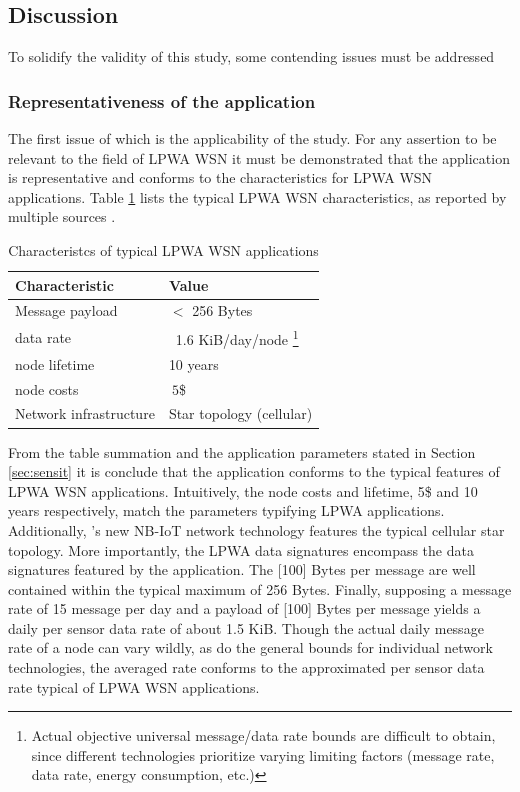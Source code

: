 \subsection{Discussion}
To solidify the validity of this study, some contending issues must be addressed

\subsubsection{Representativeness of the \sensit application}
The first issue of which is the applicability of the study. For any assertion to be relevant to the field of LPWA WSN it must be demonstrated that the \sensit application is representative and conforms to the characteristics for LPWA WSN applications. Table \ref{table:LPWA-chars} lists the typical LPWA WSN characteristics, as reported by multiple sources \cite{lora_vs_sigfox_boek, lora_vs_sigfox_whitepaper, nbiot_vs_lora_vs_sigfox, lora_vs_sigfox, tmobile, nbiot}.

\begin{table}
\centering
\begin{tabular}{|l|l|}\hline
Characteristic & Value \\ \hline
Message payload & $<$ 256 Bytes	\\ \hline
data rate &	~1.6 KiB/day/node \footnote{Actual objective universal message/data rate bounds are difficult to obtain, since different technologies prioritize varying limiting factors (message rate, data rate, energy consumption, etc.)}  \\ \hline
node lifetime & 10 years \\ \hline
node costs & $~5$\$ \\ \hline
Network infrastructure & Star topology (cellular)	\\ \hline
\end{tabular}
\caption{Characteristcs of typical LPWA WSN applications}
\label{table:LPWA-chars}
\end{table}

From the table summation and the application parameters stated in Section \ref{sec:sensit} it is conclude that the \sensit application conforms to the typical features of LPWA WSN applications. Intuitively, the node costs and lifetime, 5\$ and 10 years respectively, match the parameters typifying LPWA applications. Additionally, \sensit 's new NB-IoT network technology features the typical cellular star topology. More importantly, the LPWA data signatures encompass the data signatures featured by the \sensit application. The [100] Bytes per message are well contained within the typical maximum of 256 Bytes. Finally, supposing a message rate of 15 message per day and a payload of [100] Bytes per message yields a daily per sensor data rate of about 1.5 KiB. Though the actual daily message rate of a node can vary wildly, as do the general bounds for individual network technologies, the averaged rate conforms to the approximated per sensor data rate typical of LPWA WSN applications.

